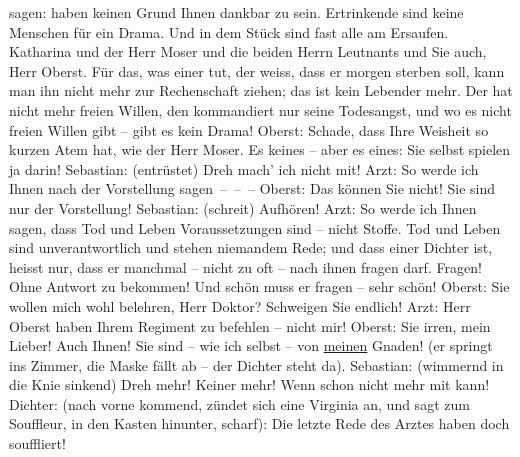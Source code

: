 \documentclass[twoside=false,titlepage=false,open=any, parskip=never, fontsize=12pt, headings=small, chapterprefix=false, appendixprefix=false]{scrbook}
\newcommand{\pbposition}{\depth}
\newcommand{\pb}{\nobreak\hspace{0pt}\raisebox{-0.1em}{\raisebox{\pbposition}{\textnormal{|}}}\nobreak\hspace{0pt}}
\begin{document}
					sagen:  haben keinen Grund Ihnen dankbar zu sein.
					Ertrinkende sind keine Menschen für ein Drama. Und in dem Stück sind fast alle
					am Ersaufen. Katharina und der Herr Moser und die beiden Herrn Leutnants und Sie
					auch, Herr Oberst. Für das, was einer tut, der weiss, dass er morgen {\pb}sterben soll, kann man ihn
					nicht mehr zur Rechenschaft ziehen; das ist kein Lebender mehr. Der hat nicht
					mehr freien Willen, den kommandiert nur seine Todesangst, und wo es nicht freien
					Willen gibt – gibt es kein Drama!\pend
           \pstart
           Oberst: Schade, dass Ihre Weisheit so kurzen Atem hat, wie der Herr Moser. Es \label{T_L01900-3v}\label{T_L01900-3h} keines – aber es \label{T_L01900-2v}\label{T_L01900-2h} eines: Sie selbst spielen ja darin!\pend
           \pstart
           Sebastian: (entrüstet)  Dreh mach’ ich nicht
					mit!\pend
           \pstart
           Arzt: So werde ich Ihnen nach der Vorstellung sagen – – –\pend
           \pstart
           Oberst: Das können Sie nicht! Sie sind nur  der
					Vorstellung!\pend
           \pstart
           Sebastian: (schreit) Aufhören!\pend
           \pstart
           Arzt: So werde ich Ihnen sagen, dass Tod und Leben Voraussetzungen sind – nicht
					Stoffe. Tod und Leben sind unverantwortlich und stehen niemandem Rede; und dass
					einer Dichter ist, heisst nur, dass er manchmal – nicht zu oft – nach ihnen
					fragen darf. Fragen! Ohne Antwort zu bekommen! Und schön muss er fragen – sehr
					schön!\pend
           \pstart
           Oberst: Sie wollen mich wohl belehren, Herr Doktor? Schweigen Sie endlich!\pend
           \pstart
           Arzt: Herr Oberst haben Ihrem Regiment zu befehlen – nicht mir!\pend
           \pstart
           Oberst: Sie irren, mein Lieber! Auch Ihnen! Sie sind – wie ich selbst – von \uline{meinen} Gnaden! (er springt ins Zimmer, die Maske
					fällt ab – der Dichter steht da).\pend
           \pstart
           Sebastian: (wimmernd in die Knie sinkend)  Dreh
					mehr! Keiner mehr! Wenn  schon nicht mehr mit
					kann!\pend
           \pstart
           Dichter: (nach vorne kommend, zündet sich eine Virginia an, und sagt zum
					Souffleur, in den Kasten hinunter, scharf): {\pb}Die letzte Rede des Arztes
					haben doch  souffliert!\pend
           \pstart
\end{document}
